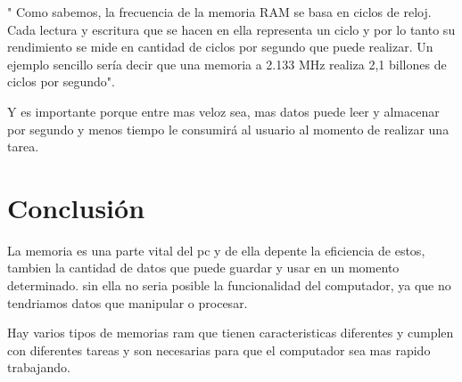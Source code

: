 \documentclass{article}
\begin{document}
" Como sabemos, la frecuencia de la memoria RAM se basa en ciclos de reloj. Cada lectura y escritura que se hacen en ella representa un ciclo y por lo tanto su rendimiento se mide en cantidad de ciclos por segundo que puede realizar. Un ejemplo sencillo sería decir que una memoria a 2.133 MHz realiza 2,1 billones de ciclos por segundo".\cite{pagina3}
\vspace{0.5cm}

Y es importante porque entre mas veloz sea, mas datos puede leer y almacenar por segundo y menos tiempo le consumirá al usuario al momento de realizar una tarea.

\section{Conclusión} \label{conclulsion}
La memoria es una parte vital del pc y de ella depente la eficiencia de estos, tambien la cantidad de datos que puede guardar y usar en un momento determinado. sin ella no seria posible la funcionalidad del computador, ya que no tendriamos datos que manipular o procesar.
\vspace{0.5cm}

Hay varios tipos de memorias ram que tienen caracteristicas diferentes y cumplen con diferentes tareas y son necesarias para que el computador sea mas rapido trabajando.



\end{document}
